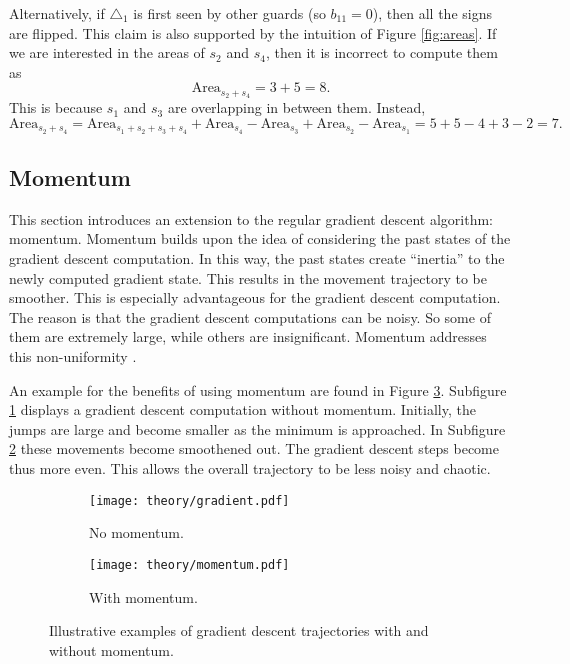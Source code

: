 \newpage
Alternatively, if $\triangle_1$ is first seen by other guards (so $b_{11} = 0$), then all the signs are flipped. This claim is also supported by the intuition of Figure \ref{fig:areas}. If we are interested in the areas of $s_2$ and $s_4$, then it is incorrect to compute them as $$\text{Area}_{s_2 + s_4} = 3 + 5 = 8.$$ This is because $s_1$ and $s_3$ are overlapping in between them.  Instead, $$\text{Area}_{s_2 + s_4} = \text{Area}_{s_1 + s_2 + s_3 + s_4} + \text{Area}_{s_4} - \text{Area}_{s_3} + \text{Area}_{s_2} - \text{Area}_{s_1} = 5 + 5 - 4 + 3 - 2 = 7.$$

\subsection{Momentum}
\label{sec:momentum}

This section introduces an extension to the regular gradient descent algorithm: momentum. 
Momentum builds upon the idea of considering the past states of the gradient descent computation. In this way, the past states create ``inertia'' to the newly computed gradient state. This results in the movement trajectory to be smoother. 
This is especially advantageous for the gradient descent computation. The reason is that the gradient descent computations can be noisy. So some of them are extremely large, while others are insignificant. Momentum addresses this non-uniformity \cite{goodfelow2016deep}.

An example for the benefits of using momentum are found in Figure \ref{fig:momentums}. Subfigure \ref{fig:theory_no_momentum} displays a gradient descent computation without momentum. Initially, the jumps are large and become smaller as the minimum is approached. In Subfigure \ref{fig:theory_momentum} these movements become smoothened out. The gradient descent steps become thus more even. This allows the overall trajectory to be less noisy and chaotic.

\begin{figure}[!h]
    \centering
    \begin{subfigure}{0.45\textwidth}
        \texttt{[image: theory/gradient.pdf]}
        \caption{No momentum.}
        \label{fig:theory_no_momentum}
    \end{subfigure}
    \hfill
    \begin{subfigure}{0.45\textwidth}
        \texttt{[image: theory/momentum.pdf]}
        \caption{With momentum.}
        \label{fig:theory_momentum}
    \end{subfigure}
    \caption{Illustrative examples of gradient descent trajectories with and without momentum.}
    \label{fig:momentums}
\end{figure}

